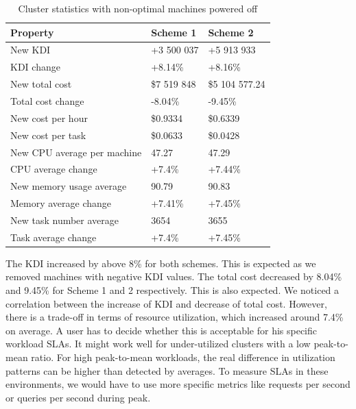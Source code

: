\documentclass[]{final_report}
\begin{document}
\begin{table}[h]
\begin{center}
    \begin{tabular}{| l | l | l |}
    \hline
    \textbf{Property} & \textbf{Scheme 1} & \textbf{Scheme 2} \\
    \hline
    New KDI & +3 500 037 & +5 913 933 \\
    \hline
    KDI change & +8.14\% & +8.16\% \\
    \hline
    New total cost & \$7 519 848 & \$5 104 577.24 \\
    \hline
    Total cost change & -8.04\% & -9.45\% \\
    \hline
    New cost per hour & \$0.9334 & \$0.6339 \\
    \hline
    New cost per task & \$0.0633  & \$0.0428 \\
    \hline
    New CPU average per machine & 47.27 & 47.29 \\
    \hline
    CPU average change & +7.4\% & +7.44\% \\
    \hline
    New memory usage average & 90.79 & 90.83 \\
    \hline
    Memory average change & +7.41\% & +7.45\% \\
    \hline
    New task number average & 3654 & 3655 \\
    \hline
    Task average change & +7.4\% & +7.45\% \\
    \hline
    \end{tabular}
\end{center}
\caption{Cluster statistics with non-optimal machines powered off}
\label{tab:squeeze-them-in}
\end{table}

The KDI increased by above 8\% for both schemes. This is expected as we removed machines with negative KDI values. The total cost decreased by 8.04\% and 9.45\% for Scheme 1 and 2 respectively. This is also expected. We noticed a correlation between the increase of KDI and decrease of total cost. However, there is a trade-off in terms of resource utilization, which increased around 7.4\% on average. A user has to decide whether this is acceptable for his specific workload SLAs. It might work well for under-utilized clusters with a low peak-to-mean ratio. For high peak-to-mean workloads, the real difference in utilization patterns can be higher than detected by averages. To measure SLAs in these environments, we would have to use more specific metrics like requests per second or queries per second during peak. 
\end{document}
